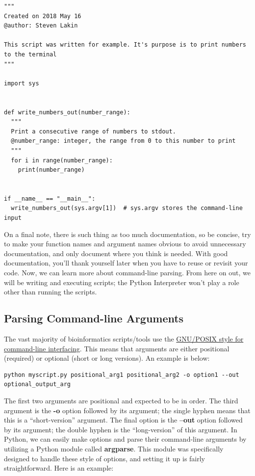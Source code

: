 \documentclass[a4paper,11pt]{article}
\begin{document}
\vspace{3mm}
\begin{lstlisting}
"""
Created on 2018 May 16
@author: Steven Lakin

This script was written for example. It's purpose is to print numbers to the terminal
"""

import sys


def write_numbers_out(number_range):
  """
  Print a consecutive range of numbers to stdout.
  @number_range: integer, the range from 0 to this number to print
  """
  for i in range(number_range):
    print(number_range)

    
if __name__ == "__main__":
  write_numbers_out(sys.argv[1])  # sys.argv stores the command-line input
\end{lstlisting}
\vspace{3mm}

On a final note, there is such thing as too much documentation, so be concise, try to make your 
function names and argument names obvious to avoid unnecessary documentation, and only 
document where you think is needed.  With good documentation, you'll thank yourself later 
when you have to reuse or revisit your code.  Now, we can learn more about command-line parsing.  
From here on out, we will be writing and executing scripts; the Python Interpreter won't play 
a role other than running the scripts.

\pagebreak
\subsection{Parsing Command-line Arguments}
The vast majority of bioinformatics scripts/tools use the 
\href{https://www.gnu.org/prep/standards/html_node/Command_002dLine-Interfaces.html}{GNU/POSIX style for 
command-line interfacing}.  This means that arguments are either positional (required) or optional 
(short or long versions).  An example is below:

\vspace{3mm}
\begin{lstlisting}
python myscript.py positional_arg1 positional_arg2 -o option1 --out optional_output_arg
\end{lstlisting}
\vspace{3mm}

The first two arguments are positional and expected to be in order.  The third argument is the \textbf{-o} option 
followed by its argument; the single hyphen means that this is a ``short-version'' argument.  The final option 
is the \textbf{--out} option followed by its argument; the double hyphen is the ``long-version'' of this argument.  
In Python, we can easily make options and parse their command-line arguments by utilizing a Python module called 
\textbf{argparse}.  This module was specifically designed to handle these style of options, and setting it 
up is fairly straightforward.  Here is an example:
\end{document}

